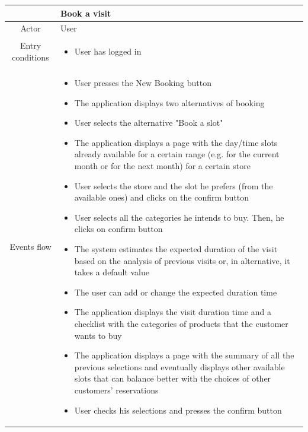 \documentclass[table, 12pt]{article}
\begin{document}
\begin{longtable}{|c| p{10cm}|}
    \hline
                     & Book a visit                                                                                                                                 \\
    \hline
    Actor            & User                                                                                                                                         \\
    \hline
    Entry conditions & \begin{itemize}
        \item User has logged in
    \end{itemize}                                                                                                                   \\
    \hline
    Events flow      & \begin{itemize}[nosep,after=\strut]
        \item User presses the New Booking button
        \item The application displays two alternatives of booking
        \item User selects the alternative "Book a slot"
        \item The application displays a page with the day/time slots already available for a certain range (e.g. for the current month or for the next month) for a certain store
        \item User selects the store and the slot he prefers (from the available ones) and clicks on the confirm button
        \item User selects all the categories he intends to buy. Then, he clicks on confirm button
        \item  The system estimates the expected duration of the visit based on the analysis of previous visits or, in alternative, it takes a default value
        \item The user can add or change the expected duration time
        \item The application displays the visit duration time and a checklist with the categories of products that the customer wants to buy
        \item The application displays a page with the summary of all the previous selections and eventually displays other available slots that can balance better with the choices of other customers' reservations
        \item User checks his selections and presses the confirm button

\end{itemize}
\end{longtable}
\end{document}

